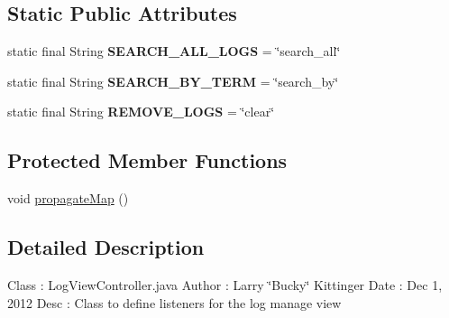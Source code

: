 \subsection*{Static Public Attributes}
\begin{DoxyCompactItemize}
\item 
\hypertarget{classw3se_1_1_controller_1_1_log_view_controller_ab97c9829e5ef37df43e2920efde2fea5}{static final String {\bfseries S\-E\-A\-R\-C\-H\-\_\-\-A\-L\-L\-\_\-\-L\-O\-G\-S} = \char`\"{}search\-\_\-all\char`\"{}}\label{classw3se_1_1_controller_1_1_log_view_controller_ab97c9829e5ef37df43e2920efde2fea5}

\item 
\hypertarget{classw3se_1_1_controller_1_1_log_view_controller_abc85ea223a461f8c75639de6eae30dfa}{static final String {\bfseries S\-E\-A\-R\-C\-H\-\_\-\-B\-Y\-\_\-\-T\-E\-R\-M} = \char`\"{}search\-\_\-by\char`\"{}}\label{classw3se_1_1_controller_1_1_log_view_controller_abc85ea223a461f8c75639de6eae30dfa}

\item 
\hypertarget{classw3se_1_1_controller_1_1_log_view_controller_a9676755a75daf99168df71834c3c8899}{static final String {\bfseries R\-E\-M\-O\-V\-E\-\_\-\-L\-O\-G\-S} = \char`\"{}clear\char`\"{}}\label{classw3se_1_1_controller_1_1_log_view_controller_a9676755a75daf99168df71834c3c8899}

\end{DoxyCompactItemize}
\subsection*{Protected Member Functions}
\begin{DoxyCompactItemize}
\item 
void \hyperlink{classw3se_1_1_controller_1_1_log_view_controller_a89d1dccbfb4f4af03d448c6ad382e828}{propagate\-Map} ()
\end{DoxyCompactItemize}


\subsection{Detailed Description}
Class \-: Log\-View\-Controller.\-java Author \-: Larry \char`\"{}\-Bucky\char`\"{} Kittinger Date \-: Dec 1, 2012 Desc \-: Class to define listeners for the log manage view 

